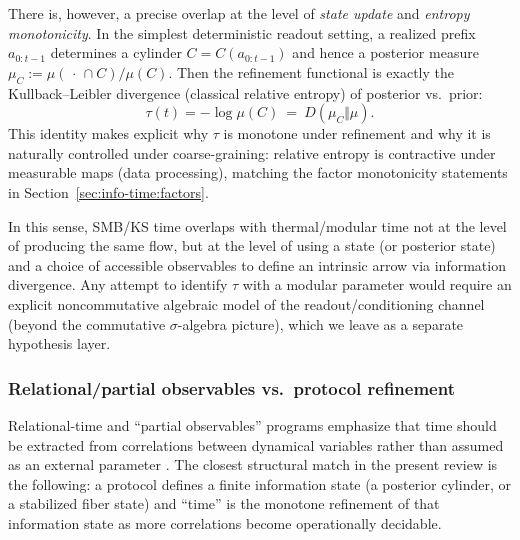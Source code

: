\begin{remark}\label{rem:tau-relative-entropy-bridge}
There is, however, a precise overlap at the level of \emph{state update} and \emph{entropy monotonicity}. In the simplest deterministic readout setting, a realized prefix $a_{0:t-1}$ determines a cylinder $C=C(a_{0:t-1})$ and hence a posterior measure $\mu_C:=\mu(\,\cdot\,\cap C)/\mu(C)$.
Then the refinement functional is exactly the Kullback--Leibler divergence (classical relative entropy) of posterior vs.\ prior:
\[
\tau(t)= -\log\mu(C)\ =\ D(\mu_C\Vert \mu).
\]
This identity makes explicit why $\tau$ is monotone under refinement and why it is naturally controlled under coarse-graining: relative entropy is contractive under measurable maps (data processing), matching the factor monotonicity statements in Section~\ref{sec:info-time:factors}.\cite{CoverThomas2006}

In this sense, SMB/KS time overlaps with thermal/modular time not at the level of producing the same flow, but at the level of using a state (or posterior state) and a choice of accessible observables to define an intrinsic arrow via information divergence. Any attempt to identify $\tau$ with a modular parameter would require an explicit noncommutative algebraic model of the readout/conditioning channel (beyond the commutative $\sigma$-algebra picture), which we leave as a separate hypothesis layer.\cite{Takesaki2003,ConnesRovelli1994}
\end{remark}

\subsubsection{Relational/partial observables vs.\ protocol refinement}\label{sec:discussion:relational}

Relational-time and ``partial observables'' programs emphasize that time should be extracted from correlations between dynamical variables rather than assumed as an external parameter \cite{Rovelli2002PartialObservables,Dittrich2006PartialCompleteObservables}. The closest structural match in the present review is the following: a protocol defines a finite information state (a posterior cylinder, or a stabilized fiber state) and ``time'' is the monotone refinement of that information state as more correlations become operationally decidable.

